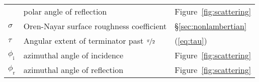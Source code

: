 \begin{center}
\begin{longtable}{W{c}{1cm} W{l}{9cm} W{l}{2cm}}
         & polar angle of reflection
         & Figure~\ref{fig:scattering}
        \\
        $\sigma$
         & Oren-Nayar surface roughness coefficient
         & \S\ref{sec:nonlambertian}
        \\
        $\tau$
         & Angular extent of terminator past $\nicefrac{\pi}{2}$
         & (\ref{eq:tau})
        \\
        $\phi_\mathrm{i}$
         & azimuthal angle of incidence
         & Figure~\ref{fig:scattering}
        \\
        $\phi_\mathrm{r}$
         & azimuthal angle of reflection
         & Figure~\ref{fig:scattering}
        \\
    \end{longtable}
\end{center}

\vfill
\pagebreak

